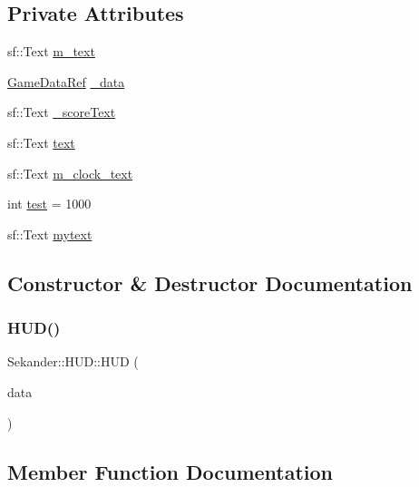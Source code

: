 \subsection*{Private Attributes}
\begin{DoxyCompactItemize}
\item 
sf\+::\+Text \hyperlink{classSekander_1_1HUD_ae30ad06dbe535abf67b75b05c3297b94}{m\+\_\+text}
\item 
\hyperlink{namespaceSekander_a1d69b002ba2d23020901c28f0def5e16}{Game\+Data\+Ref} \hyperlink{classSekander_1_1HUD_a5658d67de64e63fc05a25c09a573e447}{\+\_\+data}
\item 
sf\+::\+Text \hyperlink{classSekander_1_1HUD_a7f6f9251b486bfaf585805959e90bd67}{\+\_\+score\+Text}
\item 
sf\+::\+Text \hyperlink{classSekander_1_1HUD_a840582b62f83a28612a72c703b975ed2}{text}
\item 
sf\+::\+Text \hyperlink{classSekander_1_1HUD_a2687202d5a03a5058b3ac7e388fda66d}{m\+\_\+clock\+\_\+text}
\item 
int \hyperlink{classSekander_1_1HUD_a01751950ac1ddfb126acec810f4e947f}{test} = 1000
\item 
sf\+::\+Text \hyperlink{classSekander_1_1HUD_a73a39d3a2e8b5d648ce9ce738e48b172}{mytext}
\end{DoxyCompactItemize}


\subsection{Constructor \& Destructor Documentation}
\mbox{\label{classSekander_1_1HUD_a36e8acd746cc8528c579f9a443433f49}} 
\subsubsection{\texorpdfstring{H\+U\+D()}{HUD()}}
{\footnotesize\ttfamily Sekander\+::\+H\+U\+D\+::\+H\+UD (\begin{DoxyParamCaption}\item[{\hyperlink{namespaceSekander_a1d69b002ba2d23020901c28f0def5e16}{Game\+Data\+Ref}}]{data }\end{DoxyParamCaption})}



\subsection{Member Function Documentation}
\mbox{\label{classSekander_1_1HUD_a79da321cb1474c30707d744cf2598fda}} 
